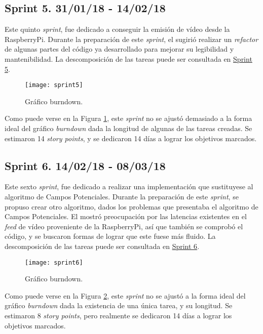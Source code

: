 \subsection{Sprint 5. 31/01/18 - 14/02/18}

Este quinto \emph{sprint}, fue dedicado a conseguir la emisión de vídeo desde la RaspberryPi.
Durante la preparación de este \emph{sprint}, el \cotutorOne{} sugirió realizar un \emph{refactor} de algunas partes del código ya desarrollado para mejorar su legibilidad y mantenibilidad.
La descomposición de las tareas puede ser consultada en \href{https://github.com/mbm0089/gii_0_17.02_snsi/milestone/5?closed=1}{Sprint 5}.

\begin{figure}
	\centering
	\texttt{[image: sprint5]}
	\caption[Burndown Sprint 5]{Gráfico burndown.}\label{fig:sprint5}
\end{figure}

Como puede verse en la Figura \ref{fig:sprint5}, este \emph{sprint} no se ajustó demasiado a la forma ideal del gráfico \emph{burndown} dada la longitud de algunas de las tareas creadas.
Se estimaron 14 \emph{story points}, y se dedicaron 14 días a lograr los objetivos marcados.

\subsection{Sprint 6. 14/02/18 - 08/03/18}

Este sexto \emph{sprint}, fue dedicado a realizar una implementación que sustituyese al algoritmo de Campos Potenciales.
Durante la preparación de este \emph{sprint}, se propuso crear otro algoritmo, dados los problemas que presentaba el algoritmo de Campos Potenciales. El \cotutorOne{} mostró preocupación por las latencias existentes en el \emph{feed} de vídeo proveniente de la RaspberryPi, así que también se comprobó el código, y se buscaron formas de lograr que este fuese más fluido.
La descomposición de las tareas puede ser consultada en \href{https://github.com/mbm0089/gii_0_17.02_snsi/milestone/6?closed=1}{Sprint 6}.

\begin{figure}
	\centering
	\texttt{[image: sprint6]}
	\caption[Burndown Sprint 6]{Gráfico burndown.}\label{fig:sprint6}
\end{figure}

Como puede verse en la Figura \ref{fig:sprint6}, este \emph{sprint} no se ajustó a la forma ideal del gráfico \emph{burndown} dada la existencia de una única tarea, y su longitud.
Se estimaron 8 \emph{story points}, pero realmente se dedicaron 14 días a lograr los objetivos marcados.

